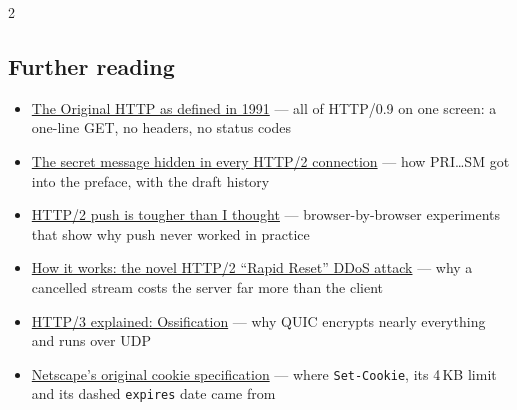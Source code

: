 \documentclass[8pt]{extarticle}
\newcommand\ct[1]{\texttt{#1}}
\begin{document}
\begin{multicols}{2}
\begin{htmlonly}
\section{Further reading}
\begin{itemize}
  \item \href{https://www.w3.org/Protocols/HTTP/AsImplemented.html}{The Original HTTP as defined in 1991}
        — all of HTTP/0.9 on one screen: a one-line GET, no headers, no status codes
  \item \href{https://blog.jgc.org/2015/11/the-secret-message-hidden-in-every.html}{The secret message hidden in every HTTP/2 connection}
        — how PRI…SM got into the preface, with the draft history
  \item \href{https://jakearchibald.com/2017/h2-push-tougher-than-i-thought/}{HTTP/2 push is tougher than I thought}
        — browser-by-browser experiments that show why push never worked in practice
  \item \href{https://cloud.google.com/blog/products/identity-security/how-it-works-the-novel-http2-rapid-reset-ddos-attack}{How it works: the novel HTTP/2 ``Rapid Reset'' DDoS attack}
        — why a cancelled stream costs the server far more than the client
  \item \href{https://http3-explained.haxx.se/en/why-quic/why-ossification}{HTTP/3 explained: Ossification}
        — why QUIC encrypts nearly everything and runs over UDP
  \item \href{https://curl.se/rfc/cookie_spec.html}{Netscape's original cookie specification}
        — where \ct{Set-Cookie}, its 4\,KB limit and its dashed \ct{expires} date came from
\end{itemize}
\end{htmlonly}

\end{multicols}

\end{document}
